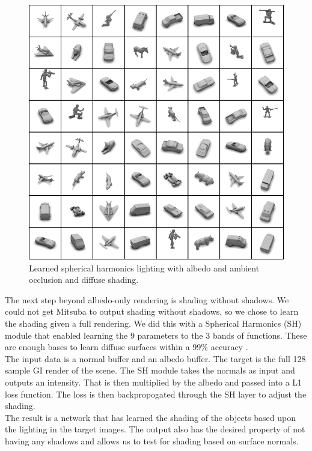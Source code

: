 \documentclass[10pt,twocolumn,letterpaper]{article}
\begin{document}
\begin{figure}[h!]
\centering
\includegraphics[trim={0 0 392px 687px},clip,width=1.0\columnwidth]{./assets/Learned_SH_plus_AO_and_Albedo.jpg}
\caption{Learned spherical harmonics lighting with albedo and ambient occlusion and diffuse shading.}
\label{fig:SH_AO_ALBEDO}
\end{figure}
The next step beyond albedo-only rendering is shading without shadows. We could not get Mitsuba to output shading without shadows, so we chose to learn the shading given a full rendering.  We did this with a Spherical Harmonics (SH) module that enabled learning the 9 parameters to the 3 bands of functions.  These are enough bases to learn diffuse surfaces within a 99\% accuracy \cite{Shreiner:2013:OPG:2544032}.\\

The input data is a normal buffer and an albedo buffer.  The target is the full 128 sample GI render of the scene.  The SH module takes the normals as input and outputs an intensity.  That is then multiplied by the albedo and passed into a L1 loss function.  The loss is then backpropogated through the SH layer to adjust the shading.\\

The result is a network that has learned the shading of the objects based upon the lighting in the target images.  The output also has the desired property of not having any shadows and allows us to test for shading based on surface normals.\\
\end{document}

